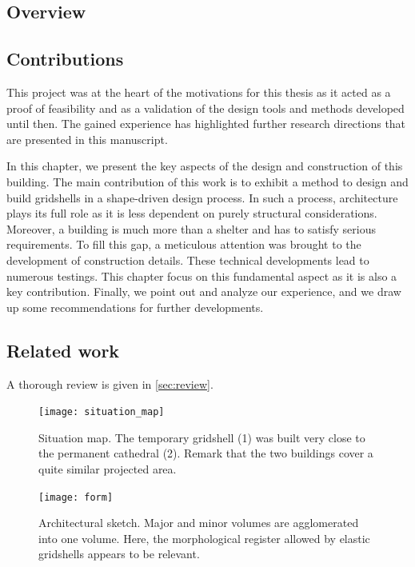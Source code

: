 \subsection{Overview}


\subsection{Contributions}

This project was at the heart of the motivations for this thesis as it acted as a proof of feasibility and as a validation of the design tools and methods developed until then. The gained experience has highlighted further research directions that are presented in this manuscript.

In this chapter, we present the key aspects of the design and construction of this building. The main contribution of this work is to exhibit a method to design and build gridshells in a shape-driven design process. In such a process, architecture plays its full role as it is less dependent on purely structural considerations. Moreover, a building is much more than a shelter and has to satisfy serious requirements. To fill this gap, a meticulous attention was brought to the development of construction details. These technical developments lead to numerous testings. This chapter focus on this fundamental aspect as it is also a key contribution. Finally, we point out and analyze our experience, and we draw up some recommendations for further developments.

\subsection{Related work}

A thorough review is given in \cref{sec:review}. 


\begin{figure}[p]
	\centering
	\begin{fullpage}
		\texttt{[image: situation\_map]}
		\caption[Situation map]{Situation map. The temporary gridshell (1) was built very close to the permanent cathedral (2). Remark that  the two buildings cover a quite similar projected area.}\label{fig:situation_map}    
		\vspace{1.5cm}
		\texttt{[image: form]}
		\caption[Architectural sketch]{Architectural sketch. Major and minor volumes are agglomerated into one volume. Here, the morphological register allowed by elastic gridshells appears to be relevant.}\label{fig:form}    
	\end{fullpage} 
\end{figure}

